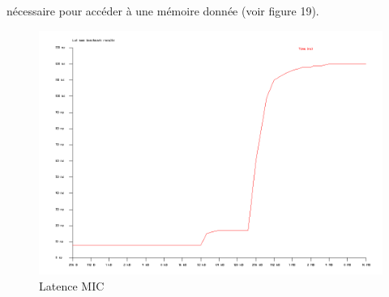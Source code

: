 \documentclass{article}
\begin{document}
					nécessaire pour accéder à une mémoire donnée (voir figure 19).
					\begin{figure}[!b]
					\begin{center}
					\includegraphics[scale=0.33]{latmem.png}
					\caption{Latence MIC}
					\end{center}
					\end{figure}
\end{document}
